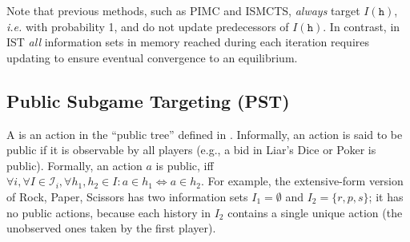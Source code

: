 \documentclass[letterpaper]{article}
\newcommand{\cI}{\mathcal{I}}
\newcommand{\tth}{\mathtt{h}}
\newcommand{\defword}[1]{\textbf{\boldmath{#1}}}
\newcommand{\ie}{{\it i.e.}\xspace}
\newcounter{vlNoteCounter}
\newcommand{\vlnote}[1]{{\scriptsize \color{blue} $\blacksquare$ \refstepcounter{vlNoteCounter}\textsf{[VL]$_{\arabic{vlNoteCounter}}$:{#1}}}}
\begin{document}
Note that previous methods, such as PIMC and ISMCTS, {\it always} target $I(\tth)$, \ie with probability 1, and do not 
update predecessors of $I(\tth)$. In contrast, in IST {\it all} information sets in memory reached during each iteration requires updating 
to ensure eventual convergence to an equilibrium.



\subsection{Public Subgame Targeting (PST)}

A \defword{public action} is an action in the ``public tree'' defined in \cite{12aamas-pcs}. Informally, an action is said to be public if it is observable by all players (e.g., a bid in Liar's Dice or Poker is public). Formally, an action $a$ is public, iff 
$\forall i, \forall I \in \cI_i, \forall h_1,h_2\in I: a\in h_1 \Leftrightarrow a\in h_2$.
For example, the extensive-form version of Rock, Paper, Scissors has two information 
sets $I_1 = \emptyset$ and $I_2 = \{ r, p, s \}$; it has no public actions, because each history in 
$I_2$ contains a single unique action (the unobserved ones taken by the first player).  

\end{document}
